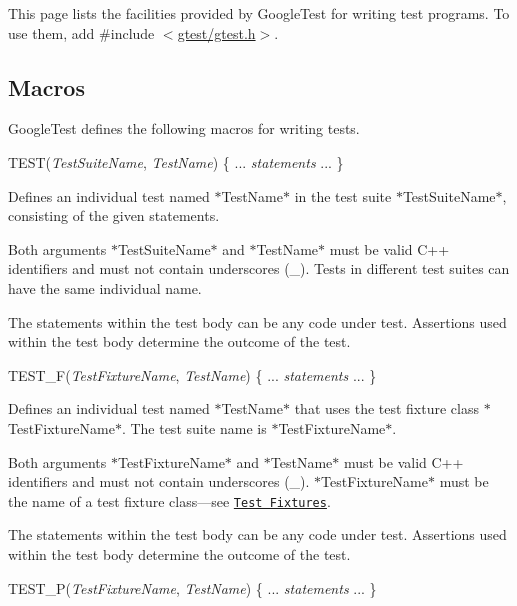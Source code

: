 This page lists the facilities provided by Google\+Test for writing test programs. To use them, add {\ttfamily \#include $<$\mbox{\hyperlink{gtest_8h_source}{gtest/gtest.\+h}}$>$}.

\subsection*{Macros}

Google\+Test defines the following macros for writing tests.


\begin{DoxyPre}
TEST({\itshape TestSuiteName}, {\itshape TestName}) \{
  ... {\itshape statements} ...
\}
\end{DoxyPre}


Defines an individual test named $\ast${\ttfamily Test\+Name}$\ast$ in the test suite $\ast${\ttfamily Test\+Suite\+Name}$\ast$, consisting of the given statements.

Both arguments $\ast${\ttfamily Test\+Suite\+Name}$\ast$ and $\ast${\ttfamily Test\+Name}$\ast$ must be valid C++ identifiers and must not contain underscores ({\ttfamily \+\_\+}). Tests in different test suites can have the same individual name.

The statements within the test body can be any code under test. Assertions used within the test body determine the outcome of the test.


\begin{DoxyPre}
TEST\_F({\itshape TestFixtureName}, {\itshape TestName}) \{
  ... {\itshape statements} ...
\}
\end{DoxyPre}


Defines an individual test named $\ast${\ttfamily Test\+Name}$\ast$ that uses the test fixture class $\ast${\ttfamily Test\+Fixture\+Name}$\ast$. The test suite name is $\ast${\ttfamily Test\+Fixture\+Name}$\ast$.

Both arguments $\ast${\ttfamily Test\+Fixture\+Name}$\ast$ and $\ast${\ttfamily Test\+Name}$\ast$ must be valid C++ identifiers and must not contain underscores ({\ttfamily \+\_\+}). $\ast${\ttfamily Test\+Fixture\+Name}$\ast$ must be the name of a test fixture class—see \href{../primer.md#same-data-multiple-tests}{\tt Test Fixtures}.

The statements within the test body can be any code under test. Assertions used within the test body determine the outcome of the test.


\begin{DoxyPre}
TEST\_P({\itshape TestFixtureName}, {\itshape TestName}) \{
  ... {\itshape statements} ...
\}
\end{DoxyPre}


